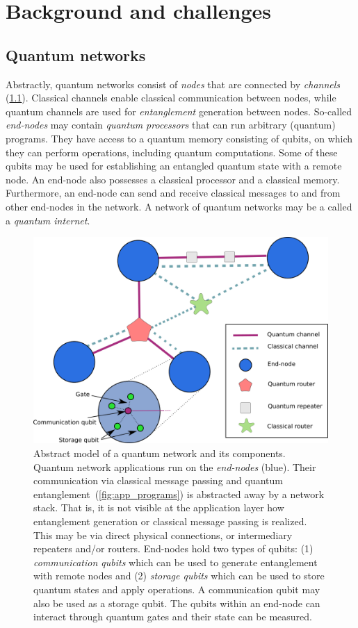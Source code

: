 \chapter
 [Background and challenges]
 {Background and challenges}
\label{chp:background}


\section{Quantum networks}

Abstractly, quantum networks consist of \textit{nodes} that are connected by \textit{channels} (\cref{fig:network_model}).
Classical channels enable classical communication between nodes, while quantum channels are used for \textit{entanglement} generation between nodes.
So-called \textit{end-nodes} may contain \textit{quantum processors} that can run arbitrary (quantum) programs.
They have access to a quantum memory consisting of qubits, on which they can perform operations, including quantum computations.
Some of these qubits may be used for establishing an entangled quantum state with a remote node.
An end-node also possesses a classical processor and a classical memory.
Furthermore, an end-node can send and receive classical messages to and from other end-nodes in the network.
A network of quantum networks may be a called a \textit{quantum internet}.

\begin{figure}[t]
    \centering
    \includegraphics[width=0.4\linewidth]{figures/netqasm/network_model.png}
    \caption{
      Abstract model of a quantum network and its components.
      Quantum network applications run on the \emph{end-nodes} (blue).
      Their communication via classical message passing and quantum entanglement~(\cref{fig:app_programs}) is abstracted away by a network stack.
      That is, it is not visible at the application layer how entanglement generation or classical message passing is realized.
      This may be via direct physical connections, or intermediary repeaters and/or routers.
      End-nodes hold two types of qubits:
        (1) \emph{communication qubits} which can be used to generate entanglement with remote nodes and
        (2) \emph{storage qubits} which can be used to store quantum states and apply operations.
      A communication qubit may also be used as a storage qubit.
      The qubits within an end-node can interact through quantum gates and their state can be measured.
    }
    \label{fig:network_model}
\end{figure}

